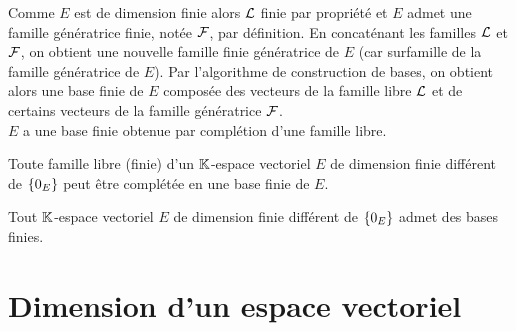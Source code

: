 \begin{dem}
\begin{enumerate}
        Comme \(E\) est de dimension finie alors \(\cal{L}\) finie par propriété et \(E\) admet une famille génératrice finie, notée \(\cal{F}\), par définition. En concaténant les familles \(\cal{L}\) et \(\cal{F}\), on obtient une nouvelle famille finie génératrice de \(E\) (car surfamille de la famille génératrice de \(E\)). Par l’algorithme de construction de bases, on obtient alors une base finie de \(E\) composée des vecteurs de la famille libre \(\cal{L}\) et de certains vecteurs de la famille génératrice \(\cal{F}\).\\
        \conclusion \(E\) a une base finie obtenue par complétion d’une famille libre.
    \end{enumerate}
\end{dem}

\begin{theo}
    Toute famille libre (finie) d’un \(\K\)-espace vectoriel \(E\) de dimension finie différent de \(\accol{0_E}\) peut être complétée en une base finie de \(E\).
\end{theo}
\begin{theo}
    Tout \(\K\)-espace vectoriel \(E\) de dimension finie différent de \(\accol{0_E}\) admet des bases finies.
\end{theo}

\section{Dimension d’un espace vectoriel}

